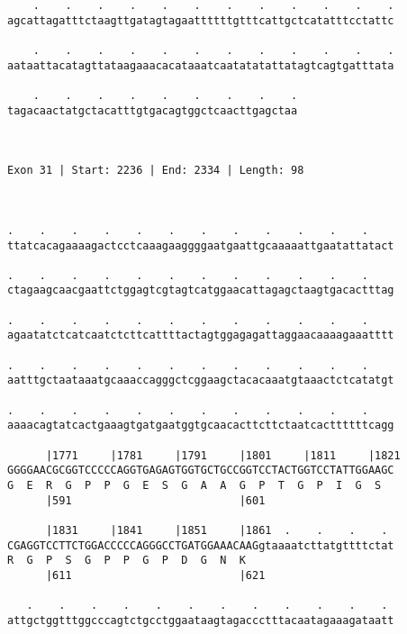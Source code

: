 \documentclass{article}
\begin{document}
\begin{Verbatim}
    .    .    .    .    .    .    .    .    .    .    .    .
agcattagatttctaagttgatagtagaattttttgtttcattgctcatatttcctattc
                                                            
    .    .    .    .    .    .    .    .    .    .    .    .
aataattacatagttataagaaacacataaatcaatatatattatagtcagtgatttata
                                                            
    .    .    .    .    .    .    .    .    .
tagacaactatgctacatttgtgacagtggctcaacttgagctaa
                                             
                                             
 
Exon 31 | Start: 2236 | End: 2334 | Length: 98



.    .    .    .    .    .    .    .    .    .    .    .    
ttatcacagaaaagactcctcaaagaaggggaatgaattgcaaaaattgaatattatact
                                                            
.    .    .    .    .    .    .    .    .    .    .    .    
ctagaagcaacgaattctggagtcgtagtcatggaacattagagctaagtgacactttag
                                                            
.    .    .    .    .    .    .    .    .    .    .    .    
agaatatctcatcaatctcttcattttactagtggagagattaggaacaaaagaaatttt
                                                            
.    .    .    .    .    .    .    .    .    .    .    .    
aatttgctaataaatgcaaaccagggctcggaagctacacaaatgtaaactctcatatgt
                                                            
.    .    .    .    .    .    .    .    .    .    .    .    
aaaacagtatcactgaaagtgatgaatggtgcaacacttcttctaatcacttttttcagg
                                                            
      |1771     |1781     |1791     |1801     |1811     |1821
GGGGAACGCGGTCCCCCAGGTGAGAGTGGTGCTGCCGGTCCTACTGGTCCTATTGGAAGC
G  E  R  G  P  P  G  E  S  G  A  A  G  P  T  G  P  I  G  S  
      |591                          |601                    
  
      |1831     |1841     |1851     |1861  .    .    .    . 
CGAGGTCCTTCTGGACCCCCAGGGCCTGATGGAAACAAGgtaaaatcttatgttttctat
R  G  P  S  G  P  P  G  P  D  G  N  K                       
      |611                          |621                    
  
   .    .    .    .    .    .    .    .    .    .    .    . 
attgctggtttggcccagtctgcctggaataagtagaccctttacaatagaaagataatt
                                                            

\end{Verbatim}
\end{document}
